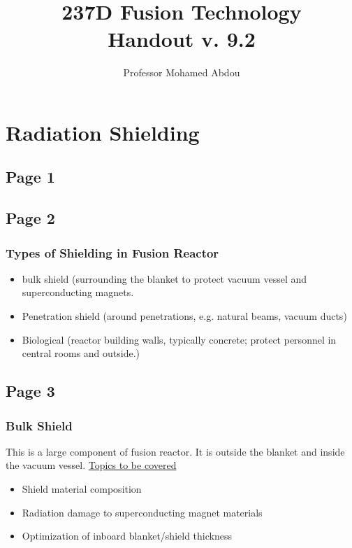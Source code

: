 \documentclass[11pt]{report} %
\title{237D Fusion Technology \\
Handout v. 9.2}
\author{Professor Mohamed Abdou}
\begin{document}
\maketitle
\chapter{Radiation Shielding}
\section{Page 1}
\section{Page 2}
\subsection{Types of Shielding in Fusion Reactor}

\begin{itemize}
\item bulk shield (surrounding the blanket to protect vacuum vessel and superconducting magnets.
\item Penetration shield (around penetrations, e.g. natural beams, vacuum ducts)
\item Biological (reactor building walls, typically concrete; protect personnel in central rooms and outside.)
\end{itemize}

\section{Page 3}
\subsection{Bulk Shield}
This is a large component of fusion reactor. It is outside the blanket and inside the vacuum vessel.
\underline{Topics to be covered}
\begin{itemize}
\item Shield material composition
\item Radiation damage to superconducting magnet materials
\item Optimization of inboard blanket/shield thickness
\end{itemize}
\end{document}
